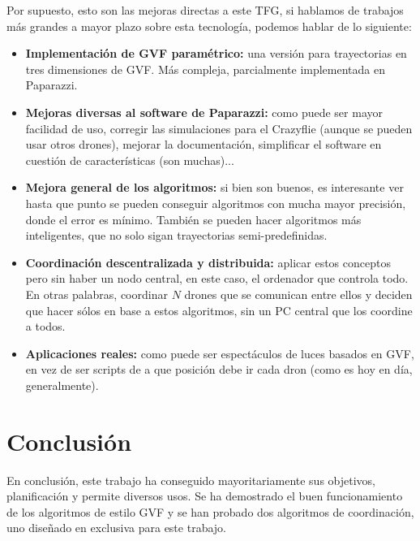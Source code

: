 Por supuesto, esto son las mejoras directas a este TFG, si hablamos de trabajos más grandes a mayor plazo sobre esta tecnología, podemos hablar de lo siguiente:

\begin{itemize}
    \item \textbf{Implementación de GVF paramétrico:} una versión para trayectorias en tres dimensiones de GVF. Más compleja, parcialmente implementada en Paparazzi.

    \item \textbf{Mejoras diversas al software de Paparazzi:} como puede ser mayor facilidad de uso, corregir las simulaciones para el Crazyflie (aunque se pueden usar otros drones), mejorar la documentación, simplificar el software en cuestión de características (son muchas)...

    \item \textbf{Mejora general de los algoritmos:} si bien son buenos, es interesante ver hasta que punto se pueden conseguir algoritmos con mucha mayor precisión, donde el error es mínimo. También se pueden hacer algoritmos más inteligentes, que no solo sigan trayectorias semi-predefinidas.

    \item \textbf{Coordinación descentralizada y distribuida:} aplicar estos conceptos pero sin haber un nodo central, en este caso, el ordenador que controla todo. En otras palabras, coordinar $N$ drones que se comunican entre ellos y deciden que hacer sólos en base a estos algoritmos, sin un PC central que los coordine a todos.

    \item \textbf{Aplicaciones reales:} como puede ser espectáculos de luces basados en GVF, en vez de ser scripts de a que posición debe ir cada dron (como es hoy en día, generalmente).
\end{itemize}


\section{Conclusión}

En conclusión, este trabajo ha conseguido mayoritariamente sus objetivos, planificación y permite diversos usos. 
Se ha demostrado el buen funcionamiento de los algoritmos de estilo GVF y se han probado dos algoritmos de coordinación, uno diseñado en exclusiva para este trabajo.

